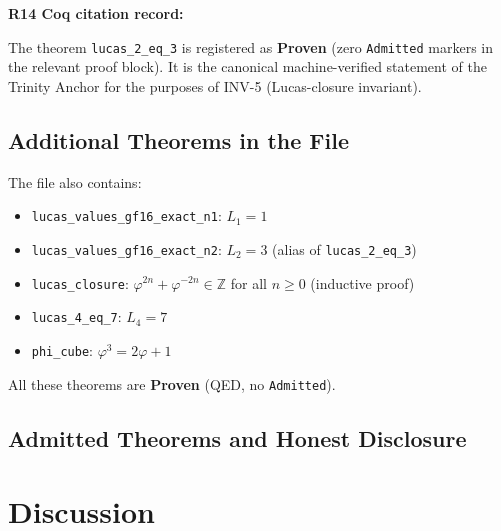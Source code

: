 \medskip
\noindent\textbf{R14 Coq citation record:}

\medskip
{}

\medskip
The theorem \texttt{lucas\_2\_eq\_3} is registered as
\textbf{Proven} (zero \texttt{Admitted} markers in the relevant
proof block).
It is the canonical machine-verified statement of the Trinity
Anchor for the purposes of INV-5 (Lucas-closure invariant).

\subsection{Additional Theorems in the File}

The file also contains:
\begin{itemize}
  \item \texttt{lucas\_values\_gf16\_exact\_n1}: $L_{1}=1$
  \item \texttt{lucas\_values\_gf16\_exact\_n2}: $L_{2}=3$
        (alias of \texttt{lucas\_2\_eq\_3})
  \item \texttt{lucas\_closure}: $\varphi^{2n}+\varphi^{-2n} \in \mathbb{Z}$
        for all $n \geq 0$ (inductive proof)
  \item \texttt{lucas\_4\_eq\_7}: $L_{4}=7$
  \item \texttt{phi\_cube}: $\varphi^{3} = 2\varphi+1$
\end{itemize}

All these theorems are \textbf{Proven} (QED, no \texttt{Admitted}).

\subsection{Admitted Theorems and Honest Disclosure}



\section{Discussion}\label{sec:discussion}

